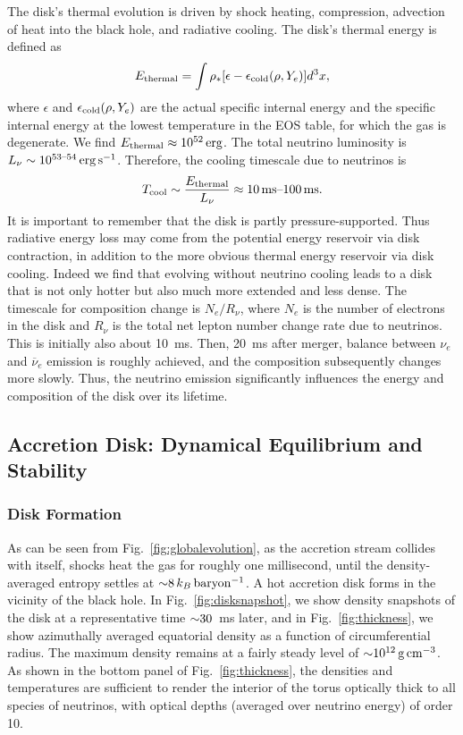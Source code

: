 The disk's thermal evolution is driven by shock heating, compression,
advection of heat into the black hole, and radiative cooling. 
The disk's thermal energy is defined as
\begin{equation}
E_{\rm thermal}=\int \rho_*[\epsilon - \epsilon_{\rm cold}(\rho,Y_e)]d^3x,
\end{equation}
where $\epsilon$ and $\epsilon_{\rm cold}(\rho,Y_e)$ are the actual
specific internal energy and the specific internal energy at the
lowest temperature in the EOS table, for which the gas is degenerate. 
We find $E_{\rm thermal}\approx 10^{52}\rm\,erg$. 
The total neutrino luminosity is $L_{\nu} \sim 10^{53\text{--}54}\rm\,erg\,s^{-1}$. 
Therefore, the cooling timescale due to neutrinos is
\begin{equation}
T_{\rm cool}\sim \frac{E_{\rm thermal}}{L_{\nu}} \approx 10{\rm\,ms}\text{--}100{\rm\,ms}.
\end{equation}
It is important to remember that the disk is partly pressure-supported.
Thus radiative energy loss
may come from the potential energy reservoir via disk contraction,
in addition to the more obvious thermal energy reservoir via disk cooling.
Indeed we find that evolving without neutrino cooling
leads to a disk that is not only hotter but also much more extended and
less dense.  The timescale for composition change
is $N_e/R_{\nu}$, where $N_e$ is the number of electrons in the disk and
$R_{\nu}$ is the total net lepton number change rate due to neutrinos. 
This is initially also about
10~ms.  Then, 20~ms after merger, balance between $\nu_e$ and $\overline{\nu}_e$
emission is roughly achieved, and the
composition subsequently changes more slowly.   Thus, the neutrino emission
significantly influences the energy and composition of the disk over its
lifetime.

\subsection{Accretion Disk: Dynamical Equilibrium and Stability}
\label{sec:disk}

\subsubsection{Disk Formation}

As can be seen from Fig.~\ref{fig:globalevolution},
as the accretion stream collides with itself, shocks heat
the gas for roughly one millisecond, until the density-averaged
entropy settles at $\mathord{\sim} 8\,k_B\,\rm baryon^{-1}$. 
A hot accretion disk forms in the vicinity of the black hole.  In
Fig.~\ref{fig:disksnapshot}, we show density snapshots
of the disk at a representative time $\mathord{\sim} 30$~ms later,
and in Fig.~\ref{fig:thickness}, we show
azimuthally averaged equatorial density as
a function of circumferential radius.  The maximum density remains at a fairly
steady level of $\mathord{\sim} 10^{12}\rm\,g\,cm^{-3}$.  As shown in the bottom
panel of Fig.~\ref{fig:thickness}, the densities and temperatures
are sufficient to render the interior of the torus optically thick
to all species of neutrinos, with optical depths (averaged over
neutrino energy) of order 10.

